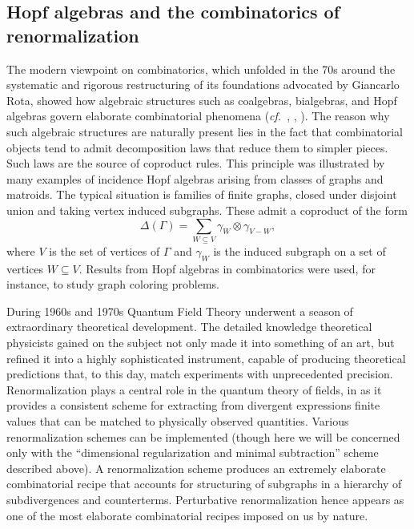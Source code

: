 \documentclass[10pt]{amsart}
\newcommand{\cf}{{\it cf.\/}\ }
\numberwithin{equation}{section}
\begin{document}
\medskip
\subsection*{Hopf algebras and the combinatorics of
renormalization}\hfill\medskip

The modern viewpoint on combinatorics, which unfolded in the 70s
around the systematic and rigorous restructuring of its foundations
advocated by Giancarlo Rota, showed how algebraic structures such as
coalgebras, bialgebras, and Hopf algebras govern elaborate
combinatorial phenomena (\cf \cite{JoRo},
\cite{Ro}, \cite{Sch}). The reason why such algebraic structures are
naturally present lies in the fact that combinatorial objects
tend to admit decomposition laws that reduce them to simpler pieces.
Such laws are the source of coproduct rules. This principle was
illustrated by many examples of incidence Hopf algebras arising from
classes of graphs and matroids. The typical situation is families of
finite graphs, closed under disjoint union and taking vertex induced
subgraphs. These admit a coproduct of the form
\begin{equation}\label{coprodcomb}
 \Delta(\Gamma)= \sum_{W\subseteq V} \gamma_W \otimes
\gamma_{V-W},
\end{equation}
where $V$ is the set of vertices of $\Gamma$ and $\gamma_W$ is the
induced subgraph on a set of vertices $W\subseteq V$. Results from
Hopf algebras in combinatorics were used, for instance, to study
graph coloring problems.

\smallskip

During 1960s and 1970s Quantum Field Theory underwent a season of
extraordinary theoretical development.
The detailed knowledge theoretical physicists gained on the subject
not only made it into something of an art, but refined it into a
highly sophisticated instrument, capable of producing
theoretical predictions that, to this day, match experiments with
unprecedented precision. Renormalization plays a central role in
the quantum theory of fields, in as it provides a consistent scheme
for extracting from divergent expressions finite values that can be
matched to physically observed quantities. Various renormalization
schemes can be implemented (though here we will be
concerned only with the ``dimensional regularization and minimal
subtraction'' scheme described above). A renormalization scheme produces an
extremely elaborate combinatorial recipe that accounts for structuring
of subgraphs in a hierarchy of subdivergences and counterterms.
Perturbative renormalization hence appears as one of the most elaborate
combinatorial recipes imposed on us by nature.
\end{document}

